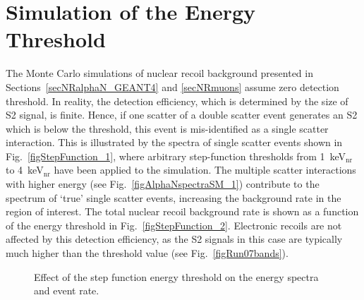 \section{Simulation of the Energy Threshold}
\label{secS2threshold}

The Monte Carlo simulations of nuclear recoil background presented in Sections~\ref{secNRalphaN_GEANT4} and \ref{secNRmuons} assume zero detection threshold. In reality, the detection efficiency, which is determined by the size of S2 signal, is finite. Hence, if one scatter of a double scatter event generates an S2 which is below the threshold, this event is mis-identified as a single scatter interaction. This is illustrated by the spectra of single scatter events shown in Fig.~\ref{figStepFunction_1}, where arbitrary step-function thresholds from 1~keV$_{\mathrm{nr}}$ to 4~keV$_{\mathrm{nr}}$ have been applied to the simulation. The multiple scatter interactions with higher energy (see Fig.~\ref{figAlphaNspectraSM_1}) contribute to the spectrum of `true' single scatter events, increasing the background rate in the region of interest. The total nuclear recoil background rate is shown as a function of the energy threshold in Fig.~\ref{figStepFunction_2}.
Electronic recoils are not affected by this detection efficiency, as the S2 signals in this case are typically much higher than the threshold value (see Fig.~\ref{figRun07bands}).

\begin{figure}[!h]
\centering
{}
\caption{Effect of the step function energy threshold on the energy spectra and event rate.}
\label{figStepFunction}
\end{figure}

